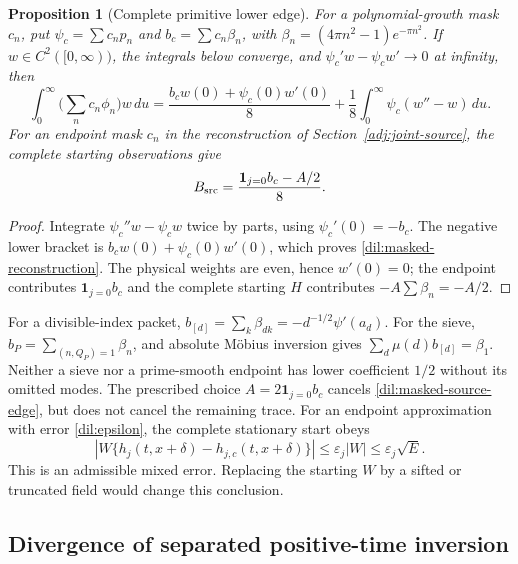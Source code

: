 \documentclass[11pt]{article}
\numberwithin{equation}{section}
\newtheorem{proposition}[theorem]{Proposition}
\theoremstyle{definition}
\theoremstyle{remark}
\begin{document}
\begin{proposition}[Complete primitive lower edge]
\label{dil:primitive-boundary}
For a polynomial-growth mask $c_n$, put
$\psi_c=\sum c_np_n$ and $b_c=\sum c_n\beta_n$, with
$\beta_n=(4\pi n^2-1)e^{-\pi n^2}$.
If $w\in C^2([0,\infty))$, the integrals below converge, and
$\psi_c'w-\psi_cw'\to0$ at infinity, then
\begin{equation}
 \int_0^\infty\Big(\sum_n c_n\phi_n\Big)w\,du
 =\frac{b_cw(0)+\psi_c(0)w'(0)}8
   +\frac18\int_0^\infty\psi_c(w''-w)\,du.
 \label{dil:masked-reconstruction}
\end{equation}
For an endpoint mask $c_n$ in the reconstruction of
Section~\ref{adj:joint-source}, the complete starting observations give
\begin{equation}
 B_{\rm src}=\frac{\mathbf1_{j=0}b_c-A/2}{8}.
 \label{dil:masked-source-edge}
\end{equation}
\end{proposition}
\begin{proof}
Integrate $\psi_c''w-\psi_cw$ twice by parts, using
$\psi_c'(0)=-b_c$. The negative lower bracket is
$b_cw(0)+\psi_c(0)w'(0)$, which proves
\eqref{dil:masked-reconstruction}. The physical weights are even, hence
$w'(0)=0$; the endpoint contributes $\mathbf1_{j=0}b_c$ and the complete
starting $H$ contributes $-A\sum\beta_n=-A/2$.
\end{proof}

For a divisible-index packet,
$b_{[d]}=\sum_k\beta_{dk}=-d^{-1/2}\psi'(a_d)$.
For the sieve, $b_P=\sum_{(n,Q_P)=1}\beta_n$, and absolute M\"obius
inversion gives $\sum_d\mu(d)b_{[d]}=\beta_1$.
Neither a sieve nor a prime-smooth endpoint has lower coefficient $1/2$
without its omitted modes. The prescribed choice
$A=2\mathbf1_{j=0}b_c$ cancels \eqref{dil:masked-source-edge}, but does
not cancel the remaining trace. For an endpoint approximation with
error \eqref{dil:epsilon}, the complete stationary start obeys
\begin{equation}
 |W\{h_j(t,x+\delta)-h_{j,c}(t,x+\delta)\}|
 \le\varepsilon_j|W|\le\varepsilon_j\sqrt E.
 \label{dil:complete-start-error}
\end{equation}
This is an admissible mixed error. Replacing the starting $W$ by a sifted
or truncated field would change this conclusion.

\subsection{Divergence of separated positive-time inversion}
\label{dil:divergence}
\end{document}
